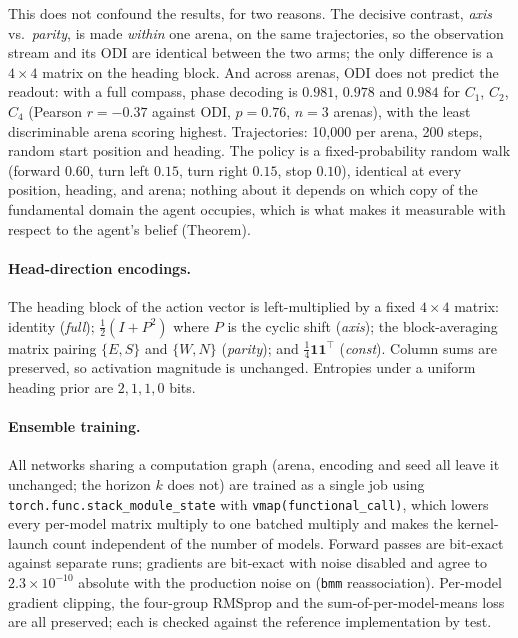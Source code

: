 This does not confound the results, for two reasons. The decisive contrast, \textit{axis} vs.\
\textit{parity}, is made \emph{within} one arena, on the same trajectories, so the observation
stream and its ODI are identical between the two arms; the only difference is a $4\times4$ matrix
on the heading block. And across arenas, ODI does not predict the readout: with a full compass,
phase decoding is $0.981$, $0.978$ and $0.984$ for $C_1$, $C_2$, $C_4$ (Pearson $r=-0.37$ against
ODI, $p=0.76$, $n=3$ arenas), with the least discriminable arena scoring highest. Trajectories:
10{,}000 per arena, 200 steps, random start position and heading. The policy is a fixed-probability
random walk (forward $0.60$, turn left $0.15$, turn right $0.15$, stop $0.10$), identical at every
position, heading, and arena; nothing about it depends on which copy of the fundamental domain the
agent occupies, which is what makes it measurable with respect to the agent's belief (Theorem).

\paragraph{Head-direction encodings.} The heading block of the action vector is left-multiplied
by a fixed $4\times4$ matrix: identity (\textit{full}); $\tfrac12(I + P^2)$ where $P$ is the
cyclic shift (\textit{axis}); the block-averaging matrix pairing $\{E,S\}$ and $\{W,N\}$
(\textit{parity}); and $\tfrac14\mathbf{1}\mathbf{1}^\top$ (\textit{const}). Column sums are
preserved, so activation magnitude is unchanged. Entropies under a uniform heading prior are
$2, 1, 1, 0$ bits.

\paragraph{Ensemble training.} All networks sharing a computation graph (arena, encoding and seed
all leave it unchanged; the horizon $k$ does not) are trained as a single job using
\texttt{torch.func.stack\_module\_state} with \texttt{vmap(functional\_call)}, which lowers every
per-model matrix multiply to one batched multiply and makes the kernel-launch count independent
of the number of models. Forward passes are bit-exact against separate runs; gradients are
bit-exact with noise disabled and agree to $2.3\times10^{-10}$ absolute with the production noise
on (\texttt{bmm} reassociation). Per-model gradient clipping, the four-group RMSprop and the
sum-of-per-model-means loss are all preserved; each is checked against the reference
implementation by test.

